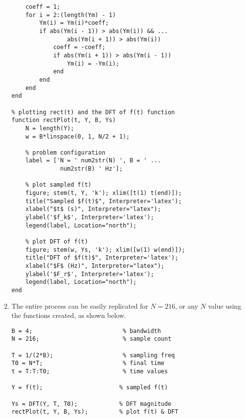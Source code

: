 \documentclass{article}
\begin{document}
\begin{enumerate}
\begin{lstlisting}[style=Matlab-editor]
    % apply sign flips
    coeff = 1;
    for i = 2:(length(Ym) - 1)
        Ym(i) = Ym(i)*coeff;
        if abs(Ym(i - 1)) > abs(Ym(i)) && ...
                abs(Ym(i + 1)) > abs(Ym(i))
            coeff = -coeff;
            if abs(Ym(i + 1)) > abs(Ym(i - 1))
                Ym(i) = -Ym(i);
            end
        end   
    end
end

% plotting rect(t) and the DFT of f(t) function
function rectPlot(t, Y, B, Ys)
    N = length(Y);
    w = B*linspace(0, 1, N/2 + 1);
    
    % problem configuration
    label = ['N = ' num2str(N) ', B = ' ...
              num2str(B) ' Hz'];

    % plot sampled f(t)
    figure; stem(t, Y, 'k'); xlim([t(1) t(end)]);
    title("Sampled $f(t)$", Interpreter='latex');
    xlabel("$t$ (s)", Interpreter="latex"); 
    ylabel('$f_k$', Interpreter='latex');
    legend(label, Location="north"); 
    
    % plot DFT of f(t)
    figure; stem(w, Ys, 'k'); xlim([w(1) w(end)]);
    title("DFT of $f(t)$", Interpreter='latex');
    xlabel("$F$ (Hz)", Interpreter="latex");
    ylabel('$F_r$', Interpreter='latex');
    legend(label, Location="north"); 
end
    \end{lstlisting}

    \item The entire process can be easily replicated for $N=216$, or any $N$ value using the functions created, as shown below.

    \begin{lstlisting}[style=Matlab-editor]
B = 4;                          % bandwidth
N = 216;                        % sample count

T = 1/(2*B);                    % sampling freq
T0 = N*T;                       % final time 
t = T:T:T0;                     % time values

Y = f(t);                      % sampled f(t)

Ys = DFT(Y, T, T0);            % DFT magnitude
rectPlot(t, Y, B, Ys);         % plot f(t) & DFT
    \end{lstlisting}   
\end{enumerate}
\end{document}
